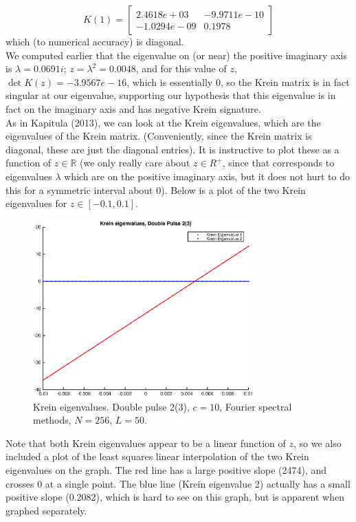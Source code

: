 \documentclass[12pt]{article}
\def\R{{\mathbb R}}
\begin{document}
\[
K(1) = \begin{bmatrix}
2.4618e+03 & -9.9711e-10 \\ -1.0294e-09 & 0.1978
\end{bmatrix}
\]
which (to numerical accuracy) is diagonal.\\

We computed earlier that the eigenvalue on (or near) the positive imaginary axis is $\lambda = 0.0691i$; $z = \lambda^2 = 0.0048$, and for this value of $z$, $\det K(z) = -3.9567e-16$, which is essentially 0, so the Krein matrix is in fact singular at our eigenvalue, supporting our hypothesis that this eigenvalue is in fact on the imaginary axis and has negative Krein signature. \\

As in Kapitula (2013), we can look at the Krein eigenvalues, which are the eigenvalues of the Krein matrix. (Conveniently, since the Krein matrix is diagonal, these are just the diagonal entries). It is instructive to plot these as a function of $z \in \R$ (we only really care about $z \in R^+$, since that corresponds to eigenvalues $\lambda$ which are on the positive imaginary axis, but it does not hurt to do this for a symmetric interval about 0). Below is a plot of the two Krein eigenvalues for $z \in [-0.1, 0.1]$.

\begin{figure}[H]
	\includegraphics[width=8.5cm]{dp2kreineig1}
	\caption{Krein eigenvalues. Double pulse 2(3), $c = 10$, Fourier spectral methods, $N = 256$, $L = 50$. }
\end{figure}

Note that both Krein eigenvalues appear to be a linear function of $z$, so we also included a plot of the least squares linear interpolation of the two Krein eigenvalues on the graph. The red line has a large positive slope (2474), and crosses 0 at a single point. The blue line (Krein eigenvalue 2) actually has a small positive slope (0.2082), which is hard to see on this graph, but is apparent when graphed separately.
\end{document}
